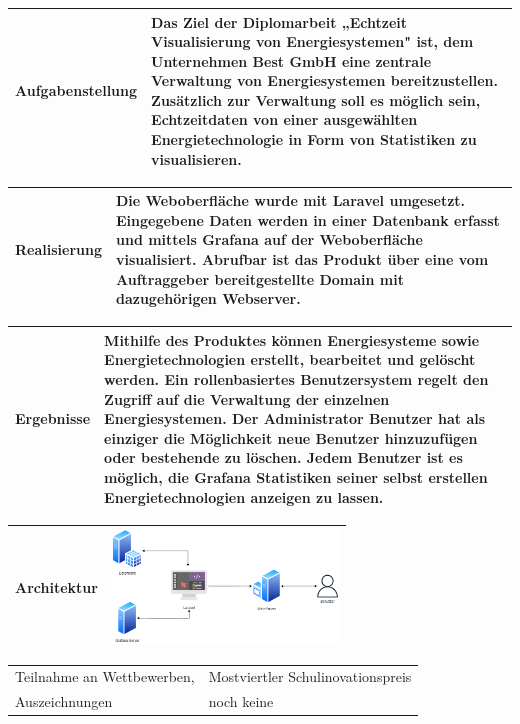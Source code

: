 \begin{tabular}{|p{\feldC}|p{\feldD}|}
 \hline
 Aufgabenstellung & Das Ziel der Diplomarbeit „Echtzeit Visualisierung von Energiesystemen" ist, dem Unternehmen Best GmbH eine zentrale Verwaltung von Energiesystemen bereitzustellen. Zusätzlich zur Verwaltung soll es möglich sein, Echtzeitdaten von einer ausgewählten Energietechnologie in Form von Statistiken zu visualisieren.\\
 \hline
\end{tabular}

\begin{tabular}{|p{\feldC}|p{\feldD}|}
 \hline
 Realisierung & Die Weboberfläche wurde mit Laravel umgesetzt. Eingegebene Daten werden in einer Datenbank erfasst und mittels Grafana auf der Weboberfläche visualisiert. Abrufbar ist das Produkt über eine vom Auftraggeber bereitgestellte Domain mit dazugehörigen Webserver.  \\
 \hline
\end{tabular}

\begin{tabular}{|p{\feldC}|p{\feldD}|}
 \hline
 Ergebnisse &  Mithilfe des Produktes können Energiesysteme sowie Energietechnologien erstellt, bearbeitet und gelöscht werden. Ein rollenbasiertes Benutzersystem regelt den Zugriff auf die Verwaltung der einzelnen Energiesystemen. Der Administrator Benutzer hat als einziger die Möglichkeit neue Benutzer hinzuzufügen oder bestehende zu löschen. Jedem Benutzer ist es möglich, die Grafana Statistiken seiner selbst erstellen Energietechnologien anzeigen zu lassen.\\
 \hline
\end{tabular}

\begin{tabular}{|p{\feldC}|p{\feldD}|}
 \hline
 Architektur &  
 \rule{0pt}{3cm+1ex} 
 \includegraphics[height=3cm]{images/1} \\
 
 \hline
\end{tabular}


\begin{tabular}{|p{\feldC}|p{\feldD}|}
 \hline
 Teilnahme an Wettbewerben, & Mostviertler Schulinovationspreis \\
 Auszeichnungen & noch keine\\
 \hline
\end{tabular}

